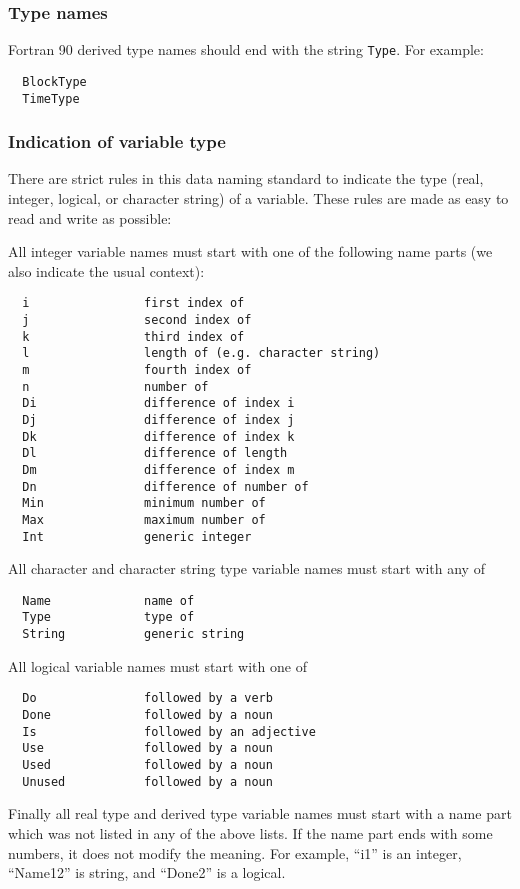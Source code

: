 \documentclass{article}
\begin{document}
\subsubsection{Type names}

Fortran 90 derived type names should end with the string {\tt Type}.
For example:
\begin{verbatim}
  BlockType
  TimeType
\end{verbatim}

\subsubsection{Indication of variable type}

There are strict rules in this data naming standard to indicate 
the type (real, integer, logical, or character string) of 
a variable. These rules are made as easy to read and write
as possible:

All integer variable names must start with one of the following name parts
(we also indicate the usual context):
\begin{verbatim}
  i                first index of
  j                second index of
  k                third index of
  l                length of (e.g. character string)
  m                fourth index of
  n                number of
  Di               difference of index i
  Dj               difference of index j
  Dk               difference of index k
  Dl               difference of length
  Dm               difference of index m
  Dn               difference of number of
  Min              minimum number of
  Max              maximum number of
  Int              generic integer
\end{verbatim}
All character and character string type variable names must start with
any of 
\begin{verbatim}
  Name             name of
  Type             type of
  String           generic string
\end{verbatim}
All logical variable names must start with one of
\begin{verbatim}
  Do               followed by a verb
  Done             followed by a noun
  Is               followed by an adjective
  Use              followed by a noun
  Used             followed by a noun
  Unused           followed by a noun
\end{verbatim}
Finally all real type and derived type variable names must start with a 
name part which was not listed in any of the above lists. If the name
part ends with some numbers, it does not modify the meaning. For example,
``i1'' is an integer, ``Name12'' is string, and ``Done2'' is a logical.
\end{document}
